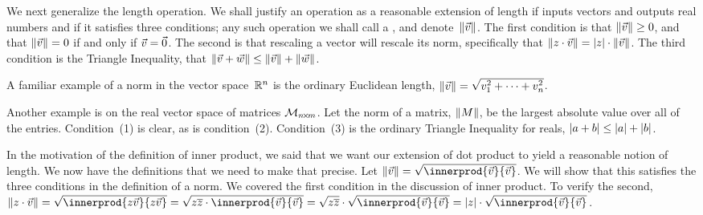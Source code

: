 We next generalize the length operation.
We shall justify an operation as a reasonable extension of length
if inputs vectors and outputs real numbers and if it satisfies
three conditions; any such operation
we shall call a , and denote~$\lVert\vec{v}\rVert$. 
The first condition is that $\lVert\vec{v}\rVert\geq 0$, 
and that $\lVert\vec{v}\rVert= 0$ if and only if $\vec{v}=\vec{0}$.
The second is that rescaling a vector will rescale 
its norm, specifically that 
$\lVert z\cdot \vec{v}\rVert=\lvert z\rvert\cdot\lVert\vec{v}\rVert$.
The third condition is 
the Triangle Inequality, 
that $\lVert\vec{v}+\vec{w}\rVert\leq\lVert\vec{v}\rVert+\lVert\vec{w}\rVert$.

A familiar example of a norm in the vector space~$\mathbb{R}^n$ is the ordinary
Euclidean length, $\norm{\vec{v}}=\sqrt{\smashdp{v_1^2+\cdots+v_n^2}}$.

Another example is on the real vector space of matrices
$\mathcal{M}_{n \! \times \! m}$.
Let the norm of a matrix, $\lVert M\rVert$, be the largest absolute value 
over all of the entries.  
Condition~(1) is clear, as is condition~(2).
Condition~(3) is the ordinary Triangle Inequality for reals,
$\lvert a+b\rvert\leq\lvert a\rvert+\lvert b\rvert$.


In the motivation of the definition of inner product, we said that we 
want our extension of dot product to yield a reasonable notion of
length.
We now have the definitions that we need to make that precise.
Let 
$\norm{\vec{v}}=\sqrt{\smashdp{\innerprod{\vec{v}}{\vec{v}}}}$.
We will show that this satisfies the 
three conditions in the definition of a norm.
We covered the first condition 
in the discussion of inner product.
To verify the second, 
$\norm{z\cdot\vec{v}}
=\sqrt{\smashdp{\innerprod{z\vec{v}}{z\vec{v}}}}
=\sqrt{\smashdp{z\compconj{z}\cdot\innerprod{\vec{v}}{\vec{v}}}}
=\sqrt{z\compconj{z}}\cdot\sqrt{\smashdp{\innerprod{\vec{v}}{\vec{v}}}}
=\absval{z}\cdot\sqrt{\smashdp{\innerprod{\vec{v}}{\vec{v}}}}$.

